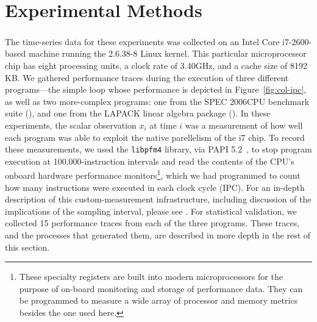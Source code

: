 \section{Experimental Methods}\label{sec:methods}



The time-series data for these experiments was collected on an Intel
Core\textsuperscript{\textregistered} i7-2600-based machine running
the 2.6.38-8 Linux kernel.  This particular microprocessor chip has
eight processing units, a clock rate of 3.40GHz, and a cache size of
8192 KB.  We gathered performance traces during the execution of three
different programs---the simple \col loop whose performance is
depicted in Figure~\ref{fig:col-ipc}, as well as two more-complex
programs: one from the SPEC 2006CPU benchmark suite (\gcc), and one
from the LAPACK linear algebra package (\svd).  In these experiments,
the scalar observation $x_{i}$ at time $i$ was a measurement of how
well each program was able to exploit the native parellelism of the i7
chip.  To record these measurements, we used the {\tt libpfm4}
library, via PAPI
% 
% 
5.2~\cite{papi}, to stop program execution at 100,000-instruction
intervals and read the contents of the CPU's onboard hardware
performance monitors\footnote{These specialty registers are built into
  modern microprocessors for the purpose of on-board monitoring and
  storage of performance data.  They can be programmed to measure a
  wide array of processor and memory metrics besides the one used
  here.}, which we had programmed to count how many instructions were
executed in each clock cycle (IPC).  For an in-depth description of
this custom-measurement infrastructure, including discussion of the
implications of the sampling interval, please see
\cite{zach-IDA10,mytkowicz09,todd-phd}.  For statistical validation,
we collected 15 performance traces from each of the three programs.
These traces, and the processes that generated them, are described in
more depth in the rest of this section.


